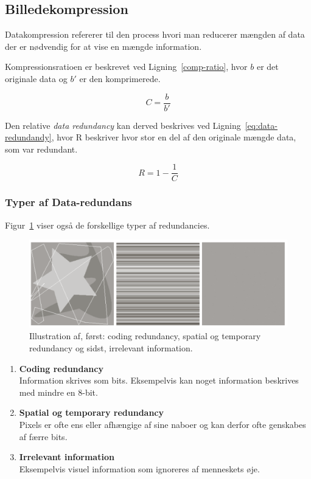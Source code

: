 \subsection{Billedekompression}

Datakompression refererer til den process hvori man reducerer mængden af data der er nødvendig for at vise en mængde information. 

Kompressionsratioen er beskrevet ved Ligning~\ref{comp-ratio}, hvor $b$ er det originale data og $b'$ er den komprimerede.

\begin{equation}\label{comp-ratio}
C = \frac{b}{b'}
\end{equation}

Den relative \textit{data redundancy} kan derved beskrives ved Ligning~\ref{eq:data-redundandy}, hvor R beskriver hvor stor en del af den originale mængde data, som var redundant.

\begin{equation}\label{eq:data-redundandy}
R = 1-\frac{1}{C}
\end{equation}

\subsubsection{Typer af Data-redundans}

Figur~\ref{fig:redundancies} viser også de forskellige typer af redundancies.

\begin{figure}[H]
	\centering
	\includegraphics[width=0.9\linewidth]{figs/spm08/redundancies}
	\caption{Illustration af, først: coding redundancy, spatial og temporary redundancy og sidst, irrelevant information.}
	\label{fig:redundancies}
\end{figure}

\begin{enumerate}
	\item \textbf{Coding redundancy}\\
	Information skrives som bits. Eksempelvis kan noget information beskrives med mindre en 8-bit.
	
	\item \textbf{Spatial og temporary redundancy}\\
	Pixels er ofte ens eller afhængige af sine naboer og kan derfor ofte genskabes af færre bits.
	
	\item \textbf{Irrelevant information}\\
	Eksempelvis visuel information som ignoreres af menneskets øje.
\end{enumerate}

